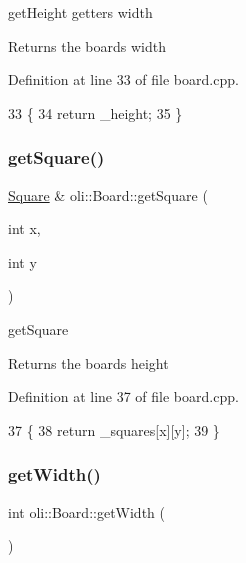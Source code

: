 get\+Height getters width 

\begin{DoxyReturn}{Returns}
the board\textquotesingle{}s width 
\end{DoxyReturn}


Definition at line 33 of file board.\+cpp.


\begin{DoxyCode}
33                     \{
34     \textcolor{keywordflow}{return} \_height;
35 \}
\end{DoxyCode}
\hypertarget{classoli_1_1_board_a5c1ce624776b1169ee16d8d815e9a453}{}\label{classoli_1_1_board_a5c1ce624776b1169ee16d8d815e9a453} 
\subsubsection{\texorpdfstring{get\+Square()}{getSquare()}}
{\footnotesize\ttfamily \hyperlink{classoli_1_1_square}{Square} \& oli\+::\+Board\+::get\+Square (\begin{DoxyParamCaption}\item[{int}]{x,  }\item[{int}]{y }\end{DoxyParamCaption})}



get\+Square 

\begin{DoxyReturn}{Returns}
the board\textquotesingle{}s height 
\end{DoxyReturn}


Definition at line 37 of file board.\+cpp.


\begin{DoxyCode}
37                                    \{
38     \textcolor{keywordflow}{return} \_squares[x][y];
39 \}
\end{DoxyCode}
\hypertarget{classoli_1_1_board_a228d72d2aa8a9df2f545ecef14e72a0d}{}\label{classoli_1_1_board_a228d72d2aa8a9df2f545ecef14e72a0d} 
\subsubsection{\texorpdfstring{get\+Width()}{getWidth()}}
{\footnotesize\ttfamily int oli\+::\+Board\+::get\+Width (\begin{DoxyParamCaption}{ }\end{DoxyParamCaption})}



